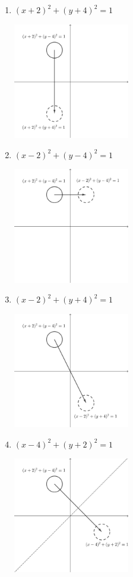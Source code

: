 \documentclass{oblivoir}
\begin{document}
\begin{multicols*}{2}
%
\begin{enumerate}
\item
\((x+2)^2+(y+4)^2=1\)
\begin{center}
\includegraphics[width=0.4\textwidth]{rreflect_6-1}
\end{center}
\vfill\null\columnbreak
\item
\((x-2)^2+(y-4)^2=1\)
\begin{center}
\includegraphics[width=0.4\textwidth]{rreflect_6-2}
\end{center}
\item
\((x-2)^2+(y+4)^2=1\)
\begin{center}
\includegraphics[width=0.4\textwidth]{rreflect_6-3}
\end{center}
\item
\((x-4)^2+(y+2)^2=1\)
\begin{center}
\includegraphics[width=0.4\textwidth]{rreflect_6-4}
\end{center}
\end{enumerate}


\end{multicols*}
\end{document}
